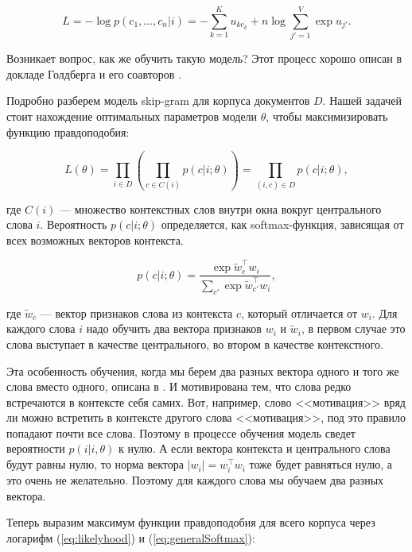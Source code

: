 \begin{equation}
 L = -\log{p(c_1, \ldots, c_n|i)} = - \sum_{k=1}^{K} u_{kc_k} + n\log{\sum_{j'=1}^{V} \exp{u_{j'}}}.
\end{equation}

Возникает вопрос, как же обучить такую модель? Этот процесс хорошо описан в докладе Голдберга и его соавторов
\cite{Goldberg}.

\bigskip
Подробно разберем модель skip-gram для корпуса документов $D$. Нашей задачей стоит нахождение оптимальных
параметров модели $\theta$, чтобы максимизировать функцию правдоподобия:

\begin{equation} \label{eq:likelyhood}
 L(\theta)=\prod_{i\in D}\left(\prod_{c\in C(i)} p(c|i;\theta)\right) = \prod_{(i,c)\in D}p(c|i;\theta),
\end{equation}

где $C(i)$ --- множество контекстных слов внутри окна вокруг центрального слова $i$. Вероятность $p(c|i;\theta
)$ определяется, как softmax-функция, зависящая от всех возможных векторов контекста.

\begin{equation} \label{eq:generalSoftmax}
 p(c|i;\theta) = \frac{\exp{\tilde{w}_c^\top w_i}}{\sum_{c'} \exp{\tilde{w}_{c'}^\top w_i}},
\end{equation}

где $\tilde{w}_c$ --- вектор признаков слова из контекста $c$, который отличается от $w_i$. Для каждого слова
$i$ надо обучить два вектора признаков $w_i$ и $\tilde{w}_i$, в первом случае это слова выступает в качестве
центрального, во втором в качестве контекстного.

\bigskip
Эта особенность обучения, когда мы берем два разных вектора одного и того же слова вместо одного, описана в
\cite{Goldberg}. И мотивирована тем, что слова редко встречаются в контексте себя самих. Вот, например, слово
<<мотивация>> вряд ли можно встретить в контексте другого слова <<мотивация>>, под это правило попадают почти
все слова. Поэтому в процессе обучения модель сведет вероятности $p(i|i, \theta)$ к нулю. А если вектора
контекста и центрального слова будут равны нулю, то норма вектора $|w_i| = w_i^\top w_i$ тоже будет равняться
нулю, а это очень не желательно. Поэтому для каждого слова мы обучаем два разных вектора.

\bigskip
Теперь выразим максимум функции правдоподобия для всего корпуса через логарифм (\ref{eq:likelyhood}) и
(\ref{eq:generalSoftmax}):

